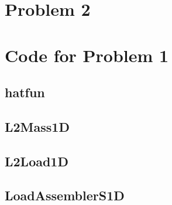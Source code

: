 \documentclass[11pt]{article}
\begin{document}
\section{Problem 2}





\appendix
\section{Code for Problem 1}
\subsection{hatfun}\label{code:hatfun}

\subsection{L2Mass1D}\label{code:L2Mass1D}

\subsection{L2Load1D}\label{code:L2Load1D}

\subsection{LoadAssemblerS1D}\label{code:LoadAssemblerS1D}
\end{document}
